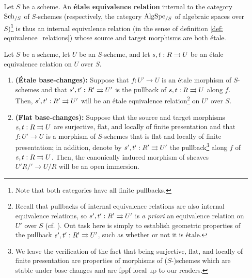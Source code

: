             \begin{definition} \label{def: etale_equivalence_relations}
                Let $S$ be a scheme. An \textbf{\'etale equivalence relation} internal to the category $\mathrm{Sch}_{/S}$ of $S$-schemes (respectively, the category $\mathrm{Alg}\mathrm{Spc}_{/S}$ of algebraic spaces over $S$)\footnote{Note that both categories have all finite pullbacks.} is thus an internal equivalence relation (in the sense of definition \ref{def: equivalence_relations}) whose source and target morphisms are both \'etale.
            \end{definition}
            \begin{lemma} \label{lemma: base_changing_etale_and_flat_equivalence_relations_in_schemes}
                Let $S$ be a scheme, let $U$ be an $S$-scheme, and let $s, t: R \rightrightarrows U$ be an \'etale equivalence relation on $U$ over $S$.
                    \begin{enumerate}
                        \item \textbf{(\'Etale base-changes):} Suppose that $f: U' \to U$ is an \'etale morphism of $S$-schemes and that $s', t': R' \rightrightarrows U'$ is the pullback of $s, t: R \rightrightarrows U$ along $f$. Then, $s', t': R' \rightrightarrows U'$ will be an \'etale equivalence relation\footnote{Recall that pullbacks of internal equivalence relations are also internal equivalence relations, so $s', t': R' \rightrightarrows U'$ is \textit{a priori} an equivalence relation on $U'$ over $S$ (cf. \cite[\href{https://stacks.math.columbia.edu/tag/02V8}{Tag 02V8}]{stacks-project}). Out task here is simply to establish geometric properties of the pullback $s', t': R' \rightrightarrows U'$, such as whether or not it is \'etale.} on $U'$ over $S$.
                        \item \textbf{(Flat base-changes):} Suppose that the source and target morphisms $s, t: R \rightrightarrows U$ are surjective, flat, and locally of finite presentation and that $f: U' \to U$ is a morphism of $S$-schemes that is flat and locally of finite presentation; in addition, denote by $s', t': R' \rightrightarrows U'$ the pullback\footnote{We leave the verification of the fact that being surjective, flat, and locally of finite presentation are properties of morphisms of ($S$-)schemes which are stable under base-changes and are fppf-local up to our readers. } along $f$ of $s, t: R \rightrightarrows U$. Then, the canonically induced morphism of sheaves $U'R/' \to U/R$ will be an open immersion. 
                    \end{enumerate}
            \end{lemma}
